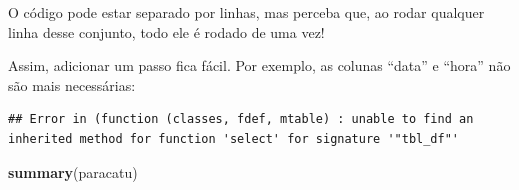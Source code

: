 \documentclass[]{book}
\newenvironment{Shaded}{\begin{snugshade}}{\end{snugshade}}
\newcommand{\KeywordTok}[1]{\textcolor[rgb]{0.13,0.29,0.53}{\textbf{#1}}}
\newcommand{\DataTypeTok}[1]{\textcolor[rgb]{0.13,0.29,0.53}{#1}}
\newcommand{\DecValTok}[1]{\textcolor[rgb]{0.00,0.00,0.81}{#1}}
\newcommand{\StringTok}[1]{\textcolor[rgb]{0.31,0.60,0.02}{#1}}
\newcommand{\CommentTok}[1]{\textcolor[rgb]{0.56,0.35,0.01}{\textit{#1}}}
\newcommand{\OperatorTok}[1]{\textcolor[rgb]{0.81,0.36,0.00}{\textbf{#1}}}
\newcommand{\NormalTok}[1]{#1}
\theoremstyle{definition}
\theoremstyle{definition}
\theoremstyle{definition}
\theoremstyle{remark}
\begin{document}
O código pode estar separado por linhas, mas perceba que, ao rodar
qualquer linha desse conjunto, todo ele é rodado de uma vez!

Assim, adicionar um passo fica fácil. Por exemplo, as colunas ``data'' e
``hora'' não são mais necessárias:

\begin{Shaded}
\end{Shaded}

\begin{verbatim}
## Error in (function (classes, fdef, mtable) : unable to find an inherited method for function 'select' for signature '"tbl_df"'
\end{verbatim}

\begin{Shaded}
\begin{Highlighting}[]
\KeywordTok{summary}\NormalTok{(paracatu)}
\end{Highlighting}
\end{Shaded}
\end{document}
